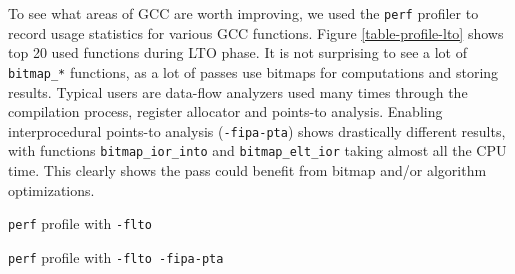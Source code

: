 To see what areas of GCC are worth improving, we used the {\tt perf} profiler to record usage
statistics for various GCC functions. Figure \ref{table-profile-lto} shows top 20 used
functions during LTO phase. It is not surprising to see a lot of {\tt bitmap\_*}
functions, as a lot of passes use bitmaps for computations and storing results.
Typical users are data-flow analyzers \cite{muchnick1997advanced} used many times through the
compilation process, register allocator and points-to analysis. Enabling
interprocedural points-to analysis ({\tt -fipa-pta}) shows drastically different
results, with functions {\tt bitmap\_ior\_into} and {\tt bitmap\_elt\_ior}
taking almost all the CPU time. This clearly shows the pass could benefit from
bitmap and/or algorithm optimizations.

\begin{table}[!ht]
\centering
\noindent
\caption{{\tt perf} profile with {\tt -flto}}
\label{table-profile-lto}
\end{table}

\begin{table}
\centering
\noindent
\caption{{\tt perf} profile with {\tt -flto -fipa-pta}}
\label{table-profile-lto-pta}
\end{table}



